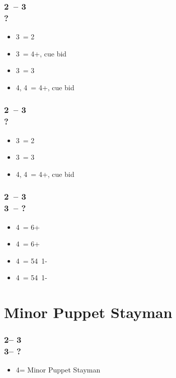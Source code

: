 \subsubsection*{2\ntx\ -- 3\diams \\ ?}
\begin{itemize}
    \item 3\hearts\ = 2\hearts
    \item 3\spades\ = 4+\hearts, cue bid
    \item 3\nt\ = 3\spades
    \item 4\clubs, 4\diams\ = 4+\hearts, cue bid
\end{itemize}

\subsubsection*{2\ntx\ -- 3\hearts \\ ?}
\begin{itemize}
    \item 3\spades\ = 2\spades
    \item 3\nt\ = 3\spades
    \item 4\clubs, 4\diams\ = 4+\spades, cue bid
\end{itemize}

\subsubsection*{2\ntx\ -- 3\spades \\ 3\nt\ -- ?}
\begin{itemize}
    \item 4\clubs\ = 6+\clubs
    \item 4\diams\ = 6+\diams
    \item 4\hearts\ = 54\minor\ 1-\hearts
    \item 4\spades\ = 54\minor\ 1-\spades
\end{itemize}

\section{\texorpdfstring{Minor Puppet Stayman}{minorPuppet}}\label{sec:minorPuppet}

\subsubsection*{2\nt -- 3\clubs\\
                3\diams -- ?}
\begin{itemize}
    \item 4\clubs = Minor Puppet Stayman
\end{itemize}


